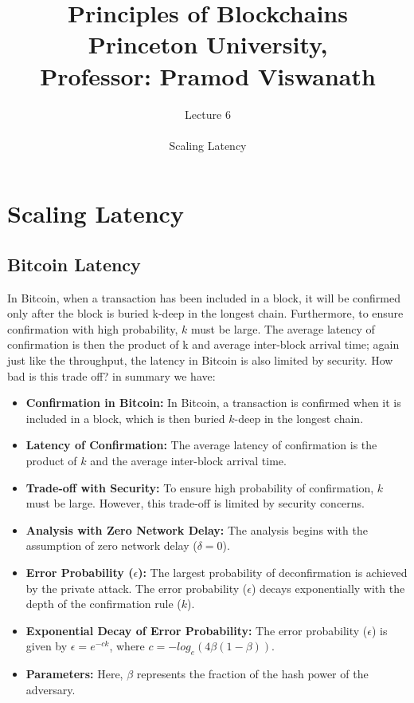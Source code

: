 \documentclass{report}
\title{\Huge{Principles of Blockchains \\ Princeton University,\\
		Professor: Pramod Viswanath}}
\author{\huge{Lecture 6} \\\\ Scaling Latency}
\begin{document}
\maketitle
\newpage%
\tableofcontents
\pagebreak

\chapter{Scaling Latency}

\section{Bitcoin Latency}
In Bitcoin, when a transaction has been included in a block, it will be confirmed only after the block is buried k-deep in the longest chain. Furthermore, to ensure confirmation with high probability, $k$ must be large. The average latency of confirmation is then the product of k and average inter-block arrival time; again just like the throughput, the latency in Bitcoin is also limited by security. How bad is this trade oﬀ? in summary we have:
\begin{itemize}
	\item \textbf{Confirmation in Bitcoin:} In Bitcoin, a transaction is confirmed when it is included in a block, which is then buried $k$-deep in the longest chain.
	\item \textbf{Latency of Confirmation:}  The average latency of confirmation is the product of $k$ and the average inter-block arrival time.
	\item \textbf{Trade-off with Security:} To ensure high probability of confirmation, $k$ must be large. However, this trade-off is limited by security concerns.
	\item \textbf{Analysis with Zero Network Delay:} The analysis begins with the assumption of zero network delay ($\delta = 0$).
	\item \textbf{Error Probability ($\epsilon$): }  The largest probability of deconfirmation is achieved by the private attack. The error probability ($\epsilon$) decays exponentially with the depth of the confirmation rule ($k$).
	\item  \textbf{Exponential Decay of Error Probability:} The error probability ($\epsilon$) is given by $\epsilon = e^{-ck}$, where $c = - log_{e}(4\beta(1 - \beta))$.
	\item \textbf{Parameters:} Here, $\beta$ represents the fraction of the hash power of the adversary.
\end{itemize}
\end{document}
